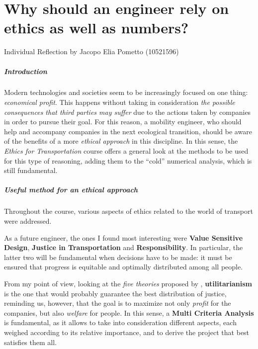 \chapter{Why should an engineer rely on ethics as well as numbers?}

\begin{flushright}
Individual Reflection by Jacopo Elia Pometto (10521596)
\end{flushright}

\paragraph{Introduction}
Modern technologies and societies seem to be increasingly focused on one thing: \textit{economical profit}. This happens without taking in consideration \textit{the possible consequences that third parties may suffer} due to the actions taken by companies in order to pursue their goal.
For this reason, a mobility engineer, who should help and accompany companies in the next ecological transition, should be aware of the benefits of a more \textit{ethical approach} in this discipline.
In this sense, the \textit{Ethics for Transportation} course offers a general look at the methods to be used for this type of reasoning, adding them to the “cold” numerical analysis, which is still fundamental.

\paragraph{Useful method for an ethical approach}
Throughout the course, various aspects of ethics related to the world of transport were addressed.

As a future engineer, the ones I found most interesting were \textbf{Value Sensitive Design}, \textbf{Justice in Transportation} and \textbf{Responsibility}. In particular, the latter two will be fundamental when decisions have to be made: it must be ensured that progress is equitable and optimally distributed among all people.

From my point of view, looking at the \textit{five theories} proposed by \cite{Pereira2017DistributiveTransportation}, \textbf{utilitarianism} is the one that would probably guarantee the best distribution of justice, reminding us, however, that the goal is to maximize not only \textit{profit} for the companies, but also \textit{welfare} for people. In this sense, a \textbf{Multi Criteria Analysis} is fundamental, as it allows to take into consideration different aspects, each weighed according to its relative importance, and to derive the project that best satisfies them all.

